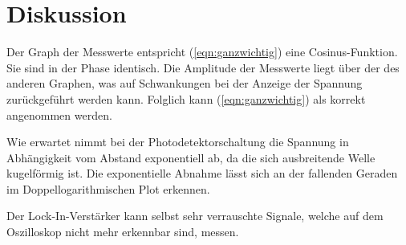 \section{Diskussion}
\label{sec:Diskussion}

Der Graph der Messwerte entspricht (\ref{eqn:ganzwichtig}) eine Cosinus-Funktion. Sie sind in der Phase identisch. Die Amplitude der Messwerte liegt über der des anderen Graphen, was auf Schwankungen bei der Anzeige der Spannung zurückgeführt werden kann.
Folglich kann (\ref{eqn:ganzwichtig}) als korrekt angenommen werden.

Wie erwartet nimmt bei der Photodetektorschaltung die Spannung in Abhängigkeit vom Abstand exponentiell ab, da die sich ausbreitende Welle kugelförmig ist. Die exponentielle Abnahme lässt sich an der fallenden Geraden im Doppellogarithmischen Plot erkennen.

Der Lock-In-Verstärker kann selbst sehr verrauschte Signale, welche auf dem Oszilloskop nicht mehr erkennbar sind, messen.
